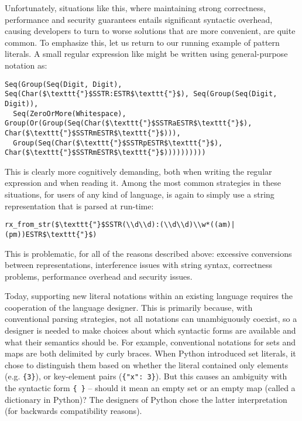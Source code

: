 Unfortunately, situations like this, where maintaining strong correctness, performance and security guarantees entails significant syntactic overhead, causing developers to turn to worse solutions that are more convenient, are quite common. To emphasize this, let us return to our running example of pattern literals. A small regular expression like  might be written using general-purpose notation as:
\begin{lstlisting}
Seq(Group(Seq(Digit, Digit), Seq(Char($\texttt{"}$SSTR:ESTR$\texttt{"}$), Seq(Group(Seq(Digit, Digit)), 
  Seq(ZeroOrMore(Whitespace), Group(Or(Group(Seq(Char($\texttt{"}$SSTRaESTR$\texttt{"}$), Char($\texttt{"}$SSTRmESTR$\texttt{"}$))), 
  Group(Seq(Char($\texttt{"}$SSTRpESTR$\texttt{"}$), Char($\texttt{"}$SSTRmESTR$\texttt{"}$))))))))))
\end{lstlisting}
This is clearly more cognitively demanding, both when writing the regular expression and when reading it. Among the most common strategies in these situations, for users of any kind of language, is again to simply use a string representation that is parsed at run-time:
\begin{lstlisting}
rx_from_str($\texttt{"}$SSTR(\\d\\d):(\\d\\d)\\w*((am)|(pm))ESTR$\texttt{"}$)
\end{lstlisting}
This is problematic, for all of the reasons described above: excessive conversions between representations, interference issues with string syntax, correctness problems, performance overhead and security issues.

Today, supporting new literal notations within an existing language requires the cooperation of the language designer. This is primarily because, with conventional parsing strategies, not all notations can unambiguously coexist, so a designer is needed to make choices about which syntactic forms are available and what their semantics should be. For example, conventional notations for sets and maps are both delimited by curly braces. When Python introduced set literals, it chose to distinguish them based on whether the literal contained only elements (e.g. \verb|{3}|), or key-element pairs (\verb|{"x": 3}|). But this causes an ambiguity with the syntactic form \verb|{ }| -- should it mean an empty set or an empty map (called a dictionary in Python)? The designers of Python chose the latter interpretation (for backwards compatibility reasons).

